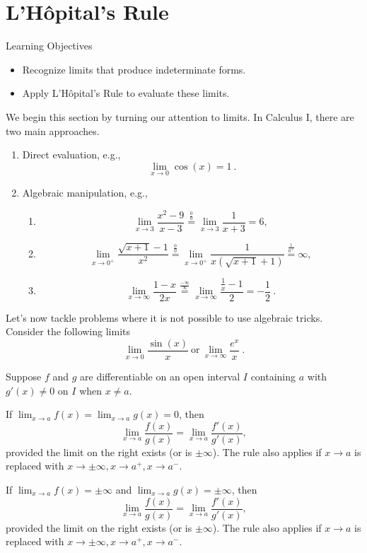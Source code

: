 \documentclass[compacto,10pt,comentarios]{aleph-notas}
\begin{document}
\encabezado

\section*{L’Hôpital's Rule}
\begin{mdframed}
    \center Learning Objectives \\
    \begin{itemize}
        \item Recognize limits that produce indeterminate forms.
        \item Apply L'Hôpital's Rule to evaluate these limits.
    \end{itemize}
\end{mdframed}
We begin this section by turning our attention to limits. In Calculus I, there are two main approaches.
\begin{enumerate}
    \item Direct evaluation, e.g.,
    $$
    \lim_{x \to 0} \cos(x) = 1 ~ .
    $$
    \item Algebraic manipulation, e.g.,
    \begin{enumerate}
        \item 
        $$
        \lim_{x \to 3} \frac{x^{2} - 9}{x - 3} \stackrel{\frac{0}{0}}{=} \lim_{x \to 3} \frac{1}{x + 3} = 6,
        $$
        \item
        $$
        \lim_{x \to 0^{+}} \frac{\sqrt{x + 1} - 1}{x^{2}} \stackrel{\frac{0}{0}}{=} \lim_{x \to 0^{+}} \frac{1}{x(\sqrt{x + 1} + 1)} \stackrel{\frac{1}{0^{+}}}{=} \infty,
        $$
        \item 
        $$
        \lim_{x \to \infty} \frac{1-x}{2x} \stackrel{\frac{-\infty}{\infty}}{=} \lim_{x \to \infty} \frac{\frac{1}{x}-1}{2} =  -\frac{1}{2} ~ .
        $$
    \end{enumerate}
\end{enumerate}

Let's now tackle problems where it is not possible to use algebraic tricks. Consider the following limits
$$
    \lim_{x \to 0} \frac{\sin(x)}{x} ~ \text{or} ~ \lim_{x \to \infty} \frac{e^{x}}{x} ~ .
$$

\begin{defi}
    Suppose $f$ and $g$ are differentiable on an open interval $I$ containing $a$ with $g'(x) \neq 0$ on $I$ when $x \neq a$.

    If $\lim_{x \to a} f(x) = \lim_{x \to a} g(x) = 0$, then
    $$
        \lim_{x \to a} \frac{f(x)}{g(x)} =         \lim_{x \to a} \frac{f'(x)}{g'(x)},
    $$
    provided the limit on the right exists (or is $\pm \infty$). The rule also applies if $x \to a$ is replaced with $x \to \pm \infty, x \to a^{+}, x \to a^{-}$.

    If $\lim_{x \to a} f(x) = \pm \infty$ and $\lim_{x \to a} g(x) = \pm \infty$, then
    $$
        \lim_{x \to a} \frac{f(x)}{g(x)} =         \lim_{x \to a} \frac{f'(x)}{g'(x)},
    $$
    provided the limit on the right exists (or is $\pm \infty$). The rule also applies if $x \to a$ is replaced with $x \to \pm \infty, x \to a^{+}, x \to a^{-}$.
\end{defi}
\end{document}
